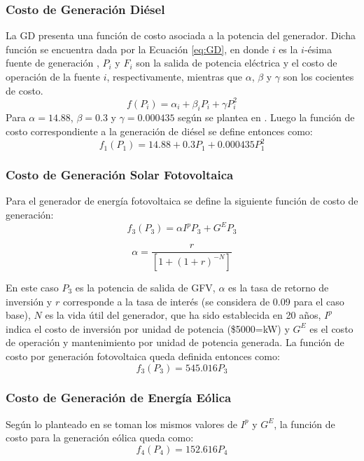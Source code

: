 \subsubsection{Costo de Generación Diésel}
La GD presenta una función de costo asociada a la potencia del generador. Dicha función se encuentra dada por la Ecuación \ref{eq:GD}, en donde $i$ es la $i$-ésima fuente de generación , $P_i$ y $F_i$ son la salida de potencia eléctrica y el costo de operación de la fuente $i$, respectivamente, mientras que $\alpha$, $\beta$  y $\gamma$ son los cocientes de costo.
 \begin{equation}\label{eq:GD}
   f(P_i)=\alpha_i +\beta_iP_i +\gamma P^2_i
 \end{equation}
Para  $\alpha=14.88$, $\beta=0.3$  y $\gamma=0.000435$ según se plantea en \cite{zapata_zapata_control_2017}. Luego la función de costo correspondiente a la generación de diésel se define entonces como:
 \begin{equation}\label{eq:GD1}
   f_1(P_1)=14.88 +0.3P_1 +0.000435 P^2_1
 \end{equation}

\subsubsection{Costo de Generación Solar Fotovoltaica}
Para el generador de energía fotovoltaica se define la siguiente función de costo de generación:
\begin{equation}\label{eq:PV1}
   f_3(P_3)=\alpha I^p P_3 +G^EP_3 
 \end{equation}
 
 \begin{equation}\label{eq:PV2}
  \alpha = \frac{r}{\left[1+(1+r)^{-N}\right]}
 \end{equation}

En este caso $P_3$ es la potencia de salida de GFV, $\alpha$ es la tasa de retorno de inversión y $r$ corresponde a la tasa de interés (se considera de 0.09 para el caso base), $N$ es la vida útil del generador, que ha sido establecida
en 20 años, $I^p$ indica el costo de inversión por unidad de potencia (\$5000=kW) y $G^E$ es el costo de operación y mantenimiento por unidad de potencia generada. La función de costo por generación fotovoltaica queda definida entonces como:
\begin{equation}\label{eq:PV3}
   f_3(P_3)=545.016P_3 
\end{equation}
\subsubsection{Costo de Generación de Energía Eólica}
Según lo planteado en \cite{zapata_zapata_control_2017} se toman los mismos
valores de $I^p$ y $G^E$, la función de costo para la generación eólica queda como:
\begin{equation}\label{eq:GE}
f_4(P_4) = 152.616P_4
\end{equation}
